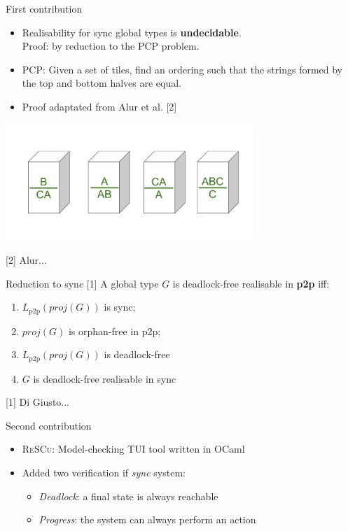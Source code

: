 \documentclass{beamer}
\begin{document}
\begin{frame}[fragile]{First contribution}
	\begin{itemize}
		\item 
	Realisability for sync global types is
	\textbf{undecidable}. \\ Proof: by reduction to the PCP problem.
	\item PCP:
	Given a set of tiles, find an ordering such that the
	strings formed by the top and bottom halves are equal.
	\item  
	Proof adaptated from Alur et al. [2]
	\end{itemize}

	\begin{center}
		\includegraphics[width=0.7\textwidth]{../img/pcp.jpg}
	\end{center}

	[2] Alur...
\end{frame}

\begin{frame}{Reduction to sync [1]}
	A global type $G$ is deadlock-free realisable in \textbf{p2p} iff:
	\begin{enumerate}
		\item $L_{\text{p2p}}(proj(G))$ is sync;
		\item $proj(G)$ is orphan-free in p2p; %
		\item $L_{\text{p2p}}(proj(G))$ is deadlock-free
		\item $G$ is deadlock-free realisable in sync
	\end{enumerate}
	
	\vspace{3cm}

	\small [1] Di Giusto...
\end{frame}

\begin{frame}[fragile]{Second contribution}

	\begin{itemize}
		\item \textsc{ReSCu}: Model-checking TUI tool written in OCaml
		\bigskip
		\item Added two verification if \emph{sync} system:
		\begin{itemize}
			\item \emph{Deadlock}: a final state is always reachable
			\item \emph{Progress}: the system can always perform an action
		\end{itemize} 
	\end{itemize}
	
\end{frame}
\end{document}
